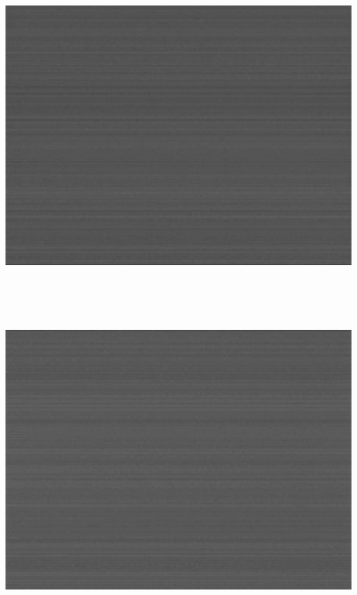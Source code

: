\begin{center}
\includegraphics[height=12cm]{images/blackframes-gainx1-offset2047-5ms-01-simple-darkframe-no-blackcol}
\end{center}

\begin{center}
\includegraphics[height=12cm]{images/blackframes-gainx1-offset2047-64ms-01-simple-darkframe-no-blackcol}
\end{center}






